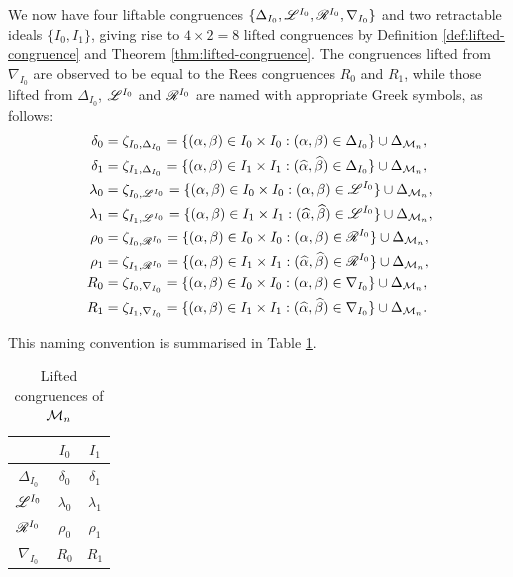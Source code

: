 We now have four liftable congruences $\{\Delta_{I_0}, \mathscr{L}^{I_0}, \mathscr{R}^{I_0}, \nabla_{I_0}\}$ and
two retractable ideals $\{I_0, I_1\}$, giving rise to $4 \times 2 = 8$ lifted
congruences by Definition \ref{def:lifted-congruence} and Theorem
\ref{thm:lifted-congruence}.  The congruences lifted from $\nabla_{I_0}$ are
observed to be equal to the Rees congruences $R_0$ and $R_1$, while those lifted
from $\Delta_{I_0}$, $\mathscr{L}^{I_0}$ and $\mathscr{R}^{I_0}$ are named with appropriate Greek symbols,
as follows:
\begin{align*}
  \delta_0 &= \zeta_{I_0,\Delta_{I_0}}
  = \{(\alpha,\beta) \in I_0 \times I_0 :
    (\alpha, \beta) \in \Delta_{I_0}\} \cup \Delta_{\mathcal{M}_n}, \\
  \delta_1 &= \zeta_{I_1,\Delta_{I_0}}
  = \{(\alpha,\beta) \in I_1 \times I_1 :
    (\widehat\alpha, \widehat\beta) \in \Delta_{I_0}\} \cup \Delta_{\mathcal{M}_n}, \\
  \lambda_0 &=\zeta_{I_0,\mathscr{L}^{I_0}}
  = \{(\alpha,\beta) \in I_0 \times I_0 :
    (\alpha, \beta) \in \mathscr{L}^{I_0}\} \cup \Delta_{\mathcal{M}_n}, \\
  \lambda_1 &= \zeta_{I_1,\mathscr{L}^{I_0}}
  = \{(\alpha,\beta) \in I_1 \times I_1 :
    (\widehat\alpha, \widehat\beta) \in \mathscr{L}^{I_0}\} \cup \Delta_{\mathcal{M}_n}, \\
  \rho_0 &= \zeta_{I_0,\mathscr{R}^{I_0}}
  = \{(\alpha,\beta) \in I_0 \times I_0 :
    (\alpha, \beta) \in \mathscr{R}^{I_0}\} \cup \Delta_{\mathcal{M}_n}, \\
  \rho_1 &= \zeta_{I_1,\mathscr{R}^{I_0}}
  = \{(\alpha,\beta) \in I_1 \times I_1 :
    (\widehat\alpha, \widehat\beta) \in \mathscr{R}^{I_0}\} \cup \Delta_{\mathcal{M}_n}, \\
  R_0 &= \zeta_{I_0,\nabla_{I_0}}
  = \{(\alpha,\beta) \in I_0 \times I_0 :
    (\alpha, \beta) \in \nabla_{I_0}\} \cup \Delta_{\mathcal{M}_n}, \\
  R_1 &= \zeta_{I_1,\nabla_{I_0}}
  = \{(\alpha,\beta) \in I_1 \times I_1 :
    (\widehat\alpha, \widehat\beta) \in \nabla_{I_0}\} \cup \Delta_{\mathcal{M}_n}.
\end{align*}

This naming convention is summarised in Table \ref{tab:mn-lifted-congruences}.

\begin{table}[ht]
  \centering
  \renewcommand\arraystretch{1.3}
  \begin{tabular}[ht]{| c | c | c |}
    \cline{2-3}
    \mc1{c|}{} & $I_0$ & $I_1$ \\ \hline
    $\Delta_{I_0}$ & $\delta_0$ & $\delta_1$ \\ \hline
    $\mathscr{L}^{I_0}$ & $\lambda_0$ & $\lambda_1$ \\ \hline
    $\mathscr{R}^{I_0}$ & $\rho_0$ & $\rho_1$ \\ \hline
    $\nabla_{I_0}$ & $R_0$ & $R_1$ \\ \hline
  \end{tabular}
  \caption{Lifted congruences of $\mathcal{M}_n$}
  \label{tab:mn-lifted-congruences}
\end{table}

